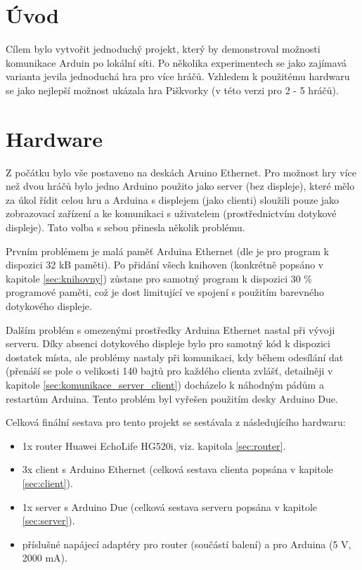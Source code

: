 \documentclass[a4paper,12pt, twoside]{article} %
\begin{document}
\section{Úvod} 
\label{sec:uvod}
Cílem bylo vytvořit jednoduchý projekt, který by demonstroval možnosti komunikace Arduin po lokální síti. Po několika experimentech se jako zajímavá varianta jevila jednoduchá hra pro více hráčů. Vzhledem k použitému hardwaru se jako nejlepší možnost ukázala hra Piškvorky (v této verzi pro 2 - 5 hráčů). 
%
\section{Hardware}
\label{sec:hardware}
Z počátku bylo vše postaveno na deskách Aruino Ethernet. Pro možnost hry více než dvou hráčů bylo jedno Arduino použito jako server (bez displeje), které mělo za úkol řídit celou hru a Arduina s displejem (jako clienti) sloužili pouze jako zobrazovací zařízení a ke komunikaci s uživatelem (prostřednictvím dotykové displeje). Tato volba s sebou přinesla několik problému. 

Prvním problémem je malá paměť Arduina Ethernet (dle \cite{arduinoEthernet_page} je pro program k dispozici 32 kB paměti). 
Po přidání všech knihoven (konkrétně popsáno v kapitole \ref{sec:knihovny}) zůstane pro samotný program k dispozici 30 \% programové paměti, což je dost limitující ve spojení s použitím barevného dotykového displeje.

Dalším problém s omezenými prostředky Arduina Ethernet nastal při vývoji serveru. Díky absenci dotykového displeje bylo pro samotný kód k dispozici dostatek místa, ale problémy nastaly při komunikaci, kdy během odesílání dat (přenáší se pole o velikosti 140 bajtů pro každého clienta zvlášť, detailněji v kapitole   \ref{sec:komunikace_server_client}) docházelo k náhodným pádům a restartům Arduina. Tento problém byl vyřešen použitím desky Arduino Due.

Celková finální sestava pro tento projekt se sestávala z následujícího hardwaru:
\begin{itemize}
\item 1x router Huawei EchoLife HG520i, viz. kapitola \ref{sec:router}.
\item 3x client s Arduino Ethernet (celková sestava clienta popsána v kapitole \ref{sec:client}).
\item 1x server s Arduino Due (celková sestava serveru popsána v kapitole \ref{sec:server}).
\item příslušné napájecí adaptéry pro router (součástí balení) a pro Arduina (5 V, 2000 mA).
\end{itemize}
\end{document}
